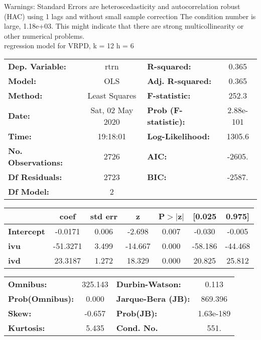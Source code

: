 Warnings: \newline
 [1] Standard Errors are heteroscedasticity and autocorrelation robust (HAC) using 1 lags and without small sample correction \newline
 [2] The condition number is large, 1.18e+03. This might indicate that there are \newline
 strong multicollinearity or other numerical problems.\\ 

regression model for VRPD, k = 12 h = 6\begin{center}
\begin{tabular}{lclc}
\toprule
\textbf{Dep. Variable:}    &       rtrn       & \textbf{  R-squared:         } &     0.365   \\
\textbf{Model:}            &       OLS        & \textbf{  Adj. R-squared:    } &     0.365   \\
\textbf{Method:}           &  Least Squares   & \textbf{  F-statistic:       } &     252.3   \\
\textbf{Date:}             & Sat, 02 May 2020 & \textbf{  Prob (F-statistic):} & 2.88e-101   \\
\textbf{Time:}             &     19:18:01     & \textbf{  Log-Likelihood:    } &    1305.6   \\
\textbf{No. Observations:} &        2726      & \textbf{  AIC:               } &    -2605.   \\
\textbf{Df Residuals:}     &        2723      & \textbf{  BIC:               } &    -2587.   \\
\textbf{Df Model:}         &           2      & \textbf{                     } &             \\
\bottomrule
\end{tabular}
\begin{tabular}{lcccccc}
                   & \textbf{coef} & \textbf{std err} & \textbf{z} & \textbf{P$> |$z$|$} & \textbf{[0.025} & \textbf{0.975]}  \\
\midrule
\textbf{Intercept} &      -0.0171  &        0.006     &    -2.698  &         0.007        &       -0.030    &       -0.005     \\
\textbf{ivu}       &     -51.3271  &        3.499     &   -14.667  &         0.000        &      -58.186    &      -44.468     \\
\textbf{ivd}       &      23.3187  &        1.272     &    18.329  &         0.000        &       20.825    &       25.812     \\
\bottomrule
\end{tabular}
\begin{tabular}{lclc}
\textbf{Omnibus:}       & 325.143 & \textbf{  Durbin-Watson:     } &     0.113  \\
\textbf{Prob(Omnibus):} &   0.000 & \textbf{  Jarque-Bera (JB):  } &   869.396  \\
\textbf{Skew:}          &  -0.657 & \textbf{  Prob(JB):          } & 1.63e-189  \\
\textbf{Kurtosis:}      &   5.435 & \textbf{  Cond. No.          } &      551.  \\
\bottomrule
\end{tabular}
\end{center}

